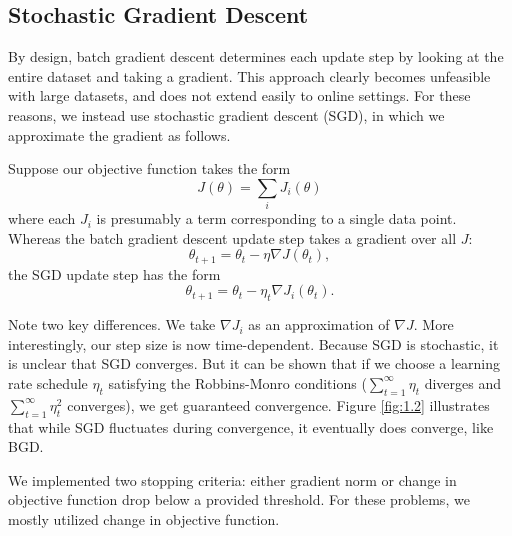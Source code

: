 \documentclass{article}
\begin{document}
\begin{multicols}{2}


\subsection{Stochastic Gradient Descent}

By design, batch gradient descent determines each update step by looking at the entire dataset and taking a gradient. This approach clearly becomes unfeasible with large datasets, and does not extend easily to online settings. For these reasons, we instead use stochastic gradient descent (SGD), in which we approximate the gradient as follows.

Suppose our objective function takes the form
\begin{equation}
J(\theta) = \sum_i J_i(\theta)
\end{equation}
where each $J_i$ is presumably a term corresponding to a single data point. Whereas the batch gradient descent update step takes a gradient over all $J$:
\begin{equation}
\theta_{t+1} = \theta_t - \eta \nabla J(\theta_t),
\end{equation}
the SGD update step has the form
\begin{equation} \theta_{t+1} = \theta_t - \eta_t \nabla J_i(\theta_t). \end{equation}

Note two key differences. We take $\nabla J_i$ as an approximation of $\nabla J$. More interestingly, our step size is now time-dependent. Because SGD is stochastic, it is unclear that SGD converges. But it can be shown that if we choose a learning rate schedule $\eta_t$ satisfying the Robbins-Monro conditions ($\sum_{t=1}^\infty \eta_t$ diverges and $\sum_{t=1}^\infty \eta_t^2$ converges), we get guaranteed convergence. Figure \ref{fig:1.2} illustrates that while SGD fluctuates during convergence, it eventually does converge, like BGD.

We implemented two stopping criteria: either gradient norm or change in objective function drop below a provided threshold. For these problems, we mostly utilized change in objective function.




\end{multicols}
\end{document}
